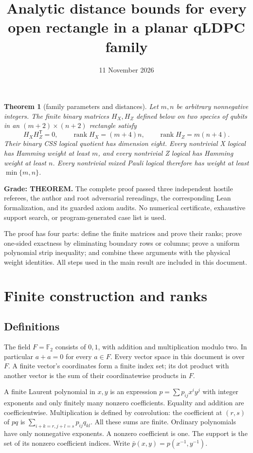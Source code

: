 \documentclass{article}
\title{Analytic distance bounds for every open rectangle in a planar qLDPC family}
\author{}
\date{11 November 2026}
\newtheorem{theorem}{Theorem}
\begin{document}
\maketitle

\begin{theorem}[family parameters and distances]\label{thm:rectangle}
Let \(m,n\) be arbitrary nonnegative integers. The finite binary matrices
\(H_X,H_Z\) defined below on two species of qubits in an
\((m+2)\times(n+2)\) rectangle satisfy
\begin{equation}\label{eq:rect-ranks}
H_XH_Z^{\mathsf T}=0,\qquad
\operatorname{rank}H_X=(m+4)n,\qquad
\operatorname{rank}H_Z=m(n+4).
\end{equation}
Their binary CSS logical quotient has dimension eight. Every nontrivial
X logical has Hamming weight at least \(m\), and every nontrivial Z logical
has Hamming weight at least \(n\). Every nontrivial mixed Pauli logical
therefore has weight at least \(\min\{m,n\}\).
\end{theorem}

\textbf{Grade: THEOREM.} The complete proof passed three independent hostile
referees, the author and root adversarial rereadings, the corresponding Lean
formalization, and its guarded axiom audits. No numerical certificate,
exhaustive support search, or program-generated case list is used.

The proof has four parts: define the finite matrices and prove their ranks;
prove one-sided exactness by eliminating boundary rows or columns;
prove a uniform polynomial strip inequality; and combine these arguments
with the physical weight identities. All steps used in the main result
are included in this document.
\section{Finite construction and ranks}
\subsection{Definitions}\label{definitions}

The field \(F=\mathbb F_2\) consists of \(0,1\), with addition and
multiplication modulo two. In particular \(a+a=0\) for every \(a\in F\).
Every vector space in this document is over \(F\). A finite vector's
coordinates form a finite index set; its dot product with another vector
is the sum of their coordinatewise products in \(F\).

A finite Laurent polynomial in \(x,y\) is an expression
\(p=\sum  p_{ij}x^iy^j\) with integer exponents and only finitely many
nonzero coefficients. Equality and addition are coefficientwise.
Multiplication is defined by convolution: the coefficient at \((r,s)\)
of \(pq\) is \(\sum _{i+k=r,j+l=s} p_{ij}q_{kl}\). All these sums are
finite. Ordinary polynomials have only nonnegative exponents. A nonzero
coefficient is one. The support is the set of its nonzero coefficient
indices. Write \(\bar p(x,y)=p(x^{-1},y^{-1})\).
\end{document}
